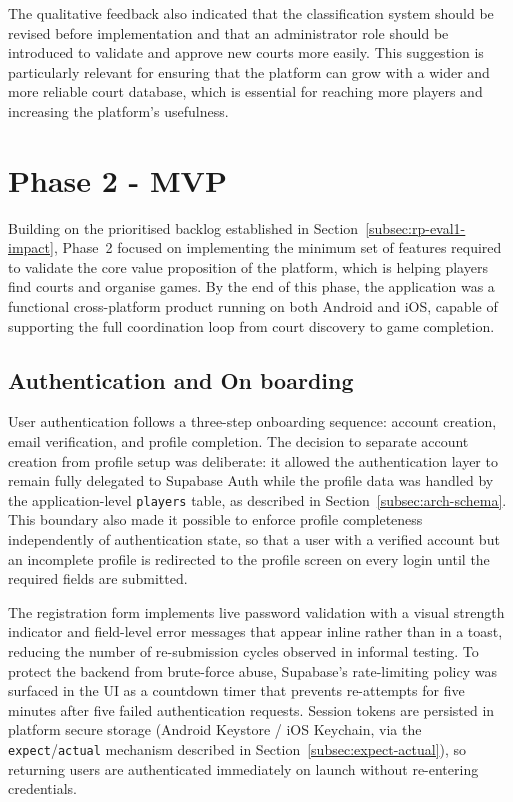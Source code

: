 The qualitative feedback also indicated that the classification system should be revised before implementation and that an administrator role should be introduced to validate and approve new courts more easily. This suggestion is particularly relevant for ensuring that the platform can grow with a wider and more reliable court database, which is essential for reaching more players and increasing the platform’s usefulness.




\section{Phase 2 - MVP}



Building on the prioritised backlog established in Section~\ref{subsec:rp-eval1-impact}, Phase~2 focused on implementing the minimum set of features required to validate the core value proposition of the platform, which is helping players find courts and organise games.
By the end of this phase, the application was a functional cross-platform product running on both Android and iOS, capable of supporting the full coordination loop from court discovery to game completion.

\subsection{Authentication and On boarding}

User authentication follows a three-step onboarding sequence: account creation, email verification, and profile completion.
The decision to separate account creation from profile setup was deliberate: it allowed the authentication layer to remain fully delegated to Supabase Auth while the profile data was handled by the application-level \texttt{players} table, as described in Section~\ref{subsec:arch-schema}.
This boundary also made it possible to enforce profile completeness independently of authentication state, so that a user with a verified account but an incomplete profile is redirected to the profile screen on every login until the required fields are submitted.

The registration form implements live password validation with a visual strength indicator and field-level error messages that appear inline rather than in a toast, reducing the number of re-submission cycles observed in informal testing.
To protect the backend from brute-force abuse, Supabase's rate-limiting policy was surfaced in the UI as a countdown timer that prevents re-attempts for five minutes after five failed authentication requests.
Session tokens are persisted in platform secure storage (Android Keystore / iOS Keychain, via the \texttt{expect}/\texttt{actual} mechanism described in Section~\ref{subsec:expect-actual}), so returning users are authenticated immediately on launch without re-entering credentials. 

